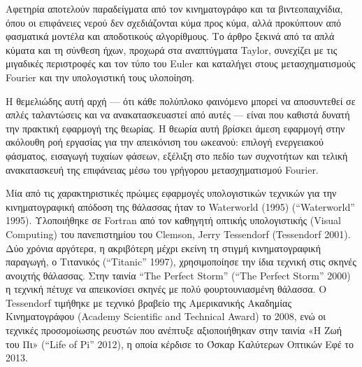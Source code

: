 Αφετηρία αποτελούν παραδείγματα από τον κινηματογράφο και τα
βιντεοπαιχνίδια, όπου οι επιφάνειες νερού δεν σχεδιάζονται κύμα προς
κύμα, αλλά προκύπτουν από φασματικά μοντέλα και αποδοτικούς αλγορίθμους.
Το άρθρο ξεκινά από τα απλά κύματα και τη σύνθεση ήχων, προχωρά στα
αναπτύγματα Taylor, συνεχίζει με τις μιγαδικές περιστροφές και τον τύπο
του Euler και καταλήγει στους μετασχηματισμούς Fourier και την
υπολογιστική τους υλοποίηση.

Η θεμελιώδης αυτή αρχή --- ότι κάθε πολύπλοκο φαινόμενο μπορεί να
αποσυντεθεί σε απλές ταλαντώσεις και να ανακατασκευαστεί από αυτές ---
είναι που καθιστά δυνατή την πρακτική εφαρμογή της θεωρίας. Η θεωρία
αυτή βρίσκει άμεση εφαρμογή στην ακόλουθη ροή εργασίας για την
απεικόνιση του ωκεανού: επιλογή ενεργειακού φάσματος, εισαγωγή τυχαίων
φάσεων, εξέλιξη στο πεδίο των συχνοτήτων και τελική ανακατασκευή της
επιφάνειας μέσω του γρήγορου μετασχηματισμού Fourier.

Μία από τις χαρακτηριστικές πρώιμες εφαρμογές υπολογιστικών τεχνικών για την
κινηματογραφική απόδοση της θάλασσας ήταν το Waterworld (1995)
({``Waterworld''} 1995). Υλοποιήθηκε σε Fortran από τον καθηγητή οπτικής
υπολογιστικής (Visual Computing) του πανεπιστημίου του Clemson, Jerry
Tessendorf (Tessendorf 2001). Δύο χρόνια αργότερα, η ακριβότερη μέχρι
εκείνη τη στιγμή κινηματογραφική παραγωγή, ο Τιτανικός ({``Titanic''}
1997), χρησιμοποίησε την ίδια τεχνική στις σκηνές ανοιχτής θάλασσας.
Στην ταινία ``The Perfect Storm'' ({``The Perfect Storm''} 2000) η
τεχνική πέτυχε να απεικονίσει σκηνές με πολύ φουρτουνιασμένη θάλασσα. Ο
Tessendorf τιμήθηκε με τεχνικό βραβείο της Αμερικανικής Ακαδημίας
Κινηματογράφου (Academy Scientific and Technical Award) το 2008, ενώ οι
τεχνικές προσομοίωσης ρευστών που ανέπτυξε αξιοποιήθηκαν στην ταινία «Η
Ζωή του Πι» ({``Life of Pi''} 2012), η οποία κέρδισε το Όσκαρ Καλύτερων
Οπτικών Εφέ το 2013.

